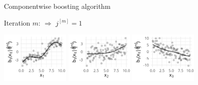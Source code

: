 \documentclass[11pt,compress,t,notes=noshow, xcolor=table]{beamer}
\begin{document}
\begin{vbframe}{Componentwise boosting algorithm}



{\footnotesize Iteration $m$: $\Rightarrow$ $j^{[m]} = 1$}
\begin{center}
\includegraphics[width=0.25\textwidth]{figure/boosting-cwb-bl1-points.png}
\hspace*{0.5cm}
\includegraphics[width=0.25\textwidth]{figure/boosting-cwb-bl2-points.png} 
\hspace*{0.5cm}
\includegraphics[width=0.25\textwidth]{figure/boosting-cwb-bl3-points.png}
\end{center}
\addtocounter{framenumber}{-1}
\end{vbframe}


\end{document}
